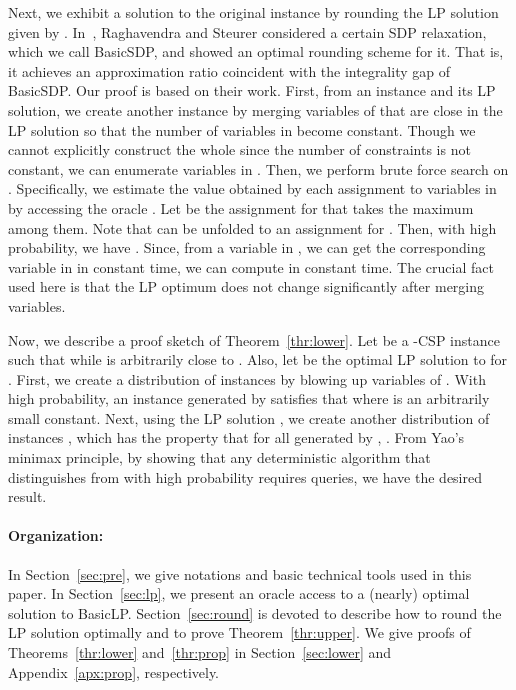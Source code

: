 \documentclass[letterpaper, 11pt]{article}
\newcommand{\blp}{\textsf{BasicLP}\xspace}
\newcommand{\bsdp}{\textsf{BasicSDP}\xspace}
\begin{document}
Next, we exhibit a solution to the original instance by rounding the LP solution given by .
In~\cite{RS09}, Raghavendra and Steurer considered a certain SDP relaxation, which we call \bsdp,
and showed an optimal rounding scheme for it.
That is, it achieves an approximation ratio coincident with the integrality gap of \bsdp.
Our proof is based on their work.
First, from an instance  and its LP solution,
we create another instance  by merging variables of  that are close in the LP solution
so that the number of variables in  become constant.
Though we cannot explicitly construct the whole  since the number of constraints is not constant,
we can enumerate variables in .
Then, we perform brute force search on .
Specifically, we estimate the value obtained by each assignment to variables in  by accessing the oracle .
Let  be the assignment for  that takes the maximum among them.
Note that  can be unfolded to an assignment  for .
Then, with high probability, we have .
Since, from a variable  in , we can get the corresponding variable in  in constant time,
we can compute  in constant time.
The crucial fact used here is that the LP optimum does not change significantly after merging variables.

Now, we describe a proof sketch of Theorem~\ref{thr:lower}.
Let  be a -CSP instance such that  while  is arbitrarily close to .
Also, let  be the optimal LP solution to  for .
First, we create a distribution of instances  by blowing up variables of .
With high probability, 
an instance  generated by  satisfies that  where  is  an arbitrarily small constant.
Next, using the LP solution ,
we create another distribution of instances , 
which has the property that for all  generated by , 
.
From Yao's minimax principle,
by showing that any deterministic algorithm that distinguishes  from  with high probability requires  queries,
we have the desired result.

\vspace{-10pt}
\paragraph{Organization:}
In Section~\ref{sec:pre},
we give notations and basic technical tools used in this paper.
In Section~\ref{sec:lp},
we present an oracle access  to a (nearly) optimal solution to \blp.
Section~\ref{sec:round} is devoted to describe how to round the LP solution optimally and to prove Theorem~\ref{thr:upper}.
We give proofs of Theorems~\ref{thr:lower} and~\ref{thr:prop} in Section~\ref{sec:lower} and Appendix~\ref{apx:prop}, respectively.
\end{document}
